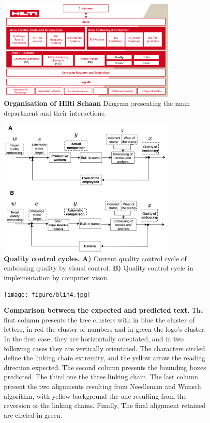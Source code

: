 \documentclass[12pt, french, a4paper]{article} %
\begin{document}
 \begin{figure}[H]
 \centering
 \includegraphics[width=0.8\textwidth]{figure/Hilti_organisation.pdf}
 \caption{\textbf{Organisation of Hilti Schaan} Diagram presenting the main department and their interactions.}
 \label{fig1_Hilti_organization}
\end{figure} 

\begin{figure}[H]
 \centering
 \includegraphics[width=0.8\textwidth]{figure/quality_cyle_sup.jpg}
 \caption{\textbf{Quality control cycles.} \textbf{A)} Current quality control cycle of embossing quality by visual control. \textbf{B)} Quality control cycle in implementation by computer vison.}
 \label{quality_cycle_sup}
\end{figure}




\begin{figure}[H]
 \centering
 \texttt{[image: figure/blin4.jpg]}
 \caption{\textbf{Comparison between the expected and predicted text.} The first column presents the tree clusters with in blue the cluster of letters, in red the cluster of numbers and in green the logo's cluster. In the first case, they are horizontally orientated, and in two following cases they are vertically orientated. The characters circled define the linking chain extremity, and the yellow arrow the reading direction expected. The second column presents the bounding boxes predicted. The third one the three linking chain. The last column present the two alignments resulting from Needleman and Wunsch \cite{spr1970general} algorithm, with yellow background the one resulting from the reversion of the linking chains. Finally, The final alignment retained are circled in green.}
 \label{blind}
\end{figure}
\end{document}
